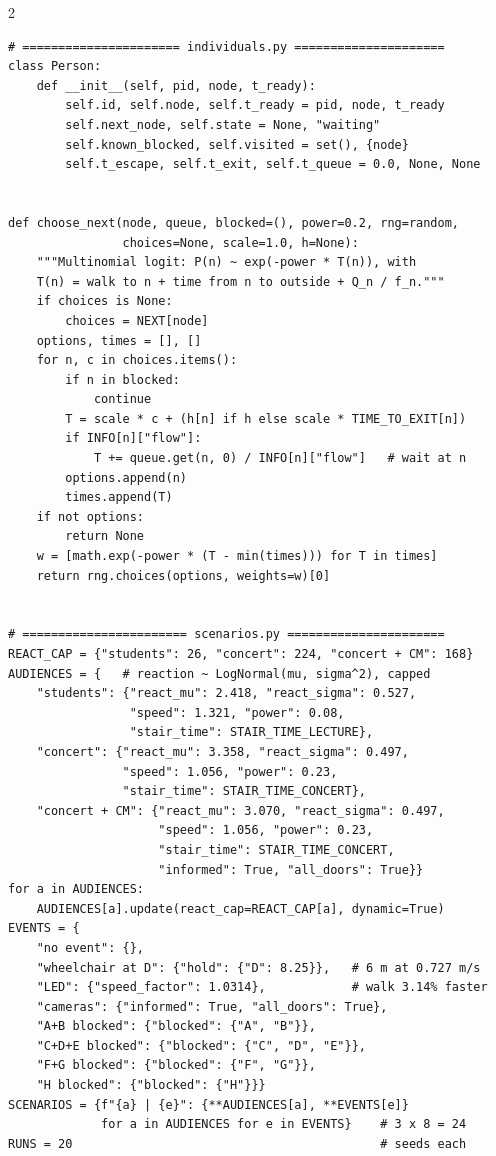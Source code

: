 \documentclass[10pt]{article}
\begin{document}
\begin{multicols*}{2}
\begin{lstlisting}
# ====================== individuals.py =====================
class Person:
    def __init__(self, pid, node, t_ready):
        self.id, self.node, self.t_ready = pid, node, t_ready
        self.next_node, self.state = None, "waiting"
        self.known_blocked, self.visited = set(), {node}
        self.t_escape, self.t_exit, self.t_queue = 0.0, None, None


def choose_next(node, queue, blocked=(), power=0.2, rng=random,
                choices=None, scale=1.0, h=None):
    """Multinomial logit: P(n) ~ exp(-power * T(n)), with
    T(n) = walk to n + time from n to outside + Q_n / f_n."""
    if choices is None:
        choices = NEXT[node]
    options, times = [], []
    for n, c in choices.items():
        if n in blocked:
            continue
        T = scale * c + (h[n] if h else scale * TIME_TO_EXIT[n])
        if INFO[n]["flow"]:
            T += queue.get(n, 0) / INFO[n]["flow"]   # wait at n
        options.append(n)
        times.append(T)
    if not options:
        return None
    w = [math.exp(-power * (T - min(times))) for T in times]
    return rng.choices(options, weights=w)[0]


# ======================= scenarios.py ======================
REACT_CAP = {"students": 26, "concert": 224, "concert + CM": 168}
AUDIENCES = {   # reaction ~ LogNormal(mu, sigma^2), capped
    "students": {"react_mu": 2.418, "react_sigma": 0.527,
                 "speed": 1.321, "power": 0.08,
                 "stair_time": STAIR_TIME_LECTURE},
    "concert": {"react_mu": 3.358, "react_sigma": 0.497,
                "speed": 1.056, "power": 0.23,
                "stair_time": STAIR_TIME_CONCERT},
    "concert + CM": {"react_mu": 3.070, "react_sigma": 0.497,
                     "speed": 1.056, "power": 0.23,
                     "stair_time": STAIR_TIME_CONCERT,
                     "informed": True, "all_doors": True}}
for a in AUDIENCES:
    AUDIENCES[a].update(react_cap=REACT_CAP[a], dynamic=True)
EVENTS = {
    "no event": {},
    "wheelchair at D": {"hold": {"D": 8.25}},   # 6 m at 0.727 m/s
    "LED": {"speed_factor": 1.0314},            # walk 3.14% faster
    "cameras": {"informed": True, "all_doors": True},
    "A+B blocked": {"blocked": {"A", "B"}},
    "C+D+E blocked": {"blocked": {"C", "D", "E"}},
    "F+G blocked": {"blocked": {"F", "G"}},
    "H blocked": {"blocked": {"H"}}}
SCENARIOS = {f"{a} | {e}": {**AUDIENCES[a], **EVENTS[e]}
             for a in AUDIENCES for e in EVENTS}    # 3 x 8 = 24
RUNS = 20                                           # seeds each



\end{lstlisting}
\end{multicols*}
\end{document}
